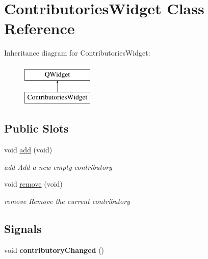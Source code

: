\hypertarget{classContributoriesWidget}{\section{Contributories\+Widget Class Reference}
\label{classContributoriesWidget}
}
Inheritance diagram for Contributories\+Widget\+:\begin{figure}[H]
\begin{center}
\leavevmode
\includegraphics[height=2.000000cm]{d0/d0b/classContributoriesWidget}
\end{center}
\end{figure}
\subsection*{Public Slots}
\begin{DoxyCompactItemize}
\item 
\hypertarget{classContributoriesWidget_a58cdea8c2397c8bd1103e7a415f3e313}{void \hyperlink{classContributoriesWidget_a58cdea8c2397c8bd1103e7a415f3e313}{add} (void)}\label{classContributoriesWidget_a58cdea8c2397c8bd1103e7a415f3e313}

\begin{DoxyCompactList}\small\item\em add Add a new empty contributory \end{DoxyCompactList}\item 
\hypertarget{classContributoriesWidget_a8203c0d2b23e658189dfd4b5ed9c8fbf}{void \hyperlink{classContributoriesWidget_a8203c0d2b23e658189dfd4b5ed9c8fbf}{remove} (void)}\label{classContributoriesWidget_a8203c0d2b23e658189dfd4b5ed9c8fbf}

\begin{DoxyCompactList}\small\item\em remove Remove the current contributory \end{DoxyCompactList}\end{DoxyCompactItemize}
\subsection*{Signals}
\begin{DoxyCompactItemize}
\item 
\hypertarget{classContributoriesWidget_a94fc0c73611fe0040b4eb9e171c42ce4}{void {\bfseries contributory\+Changed} ()}\label{classContributoriesWidget_a94fc0c73611fe0040b4eb9e171c42ce4}

\end{DoxyCompactItemize}

